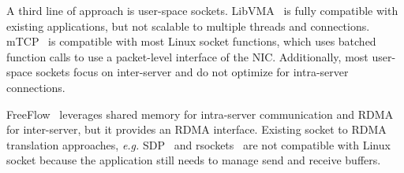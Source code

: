 A third line of approach is user-space sockets.
LibVMA~\cite{libvma} is fully compatible with existing applications, but not scalable to multiple threads and connections.
mTCP~\cite{jeong2014mtcp} is compatible with most Linux socket functions, which uses batched function calls to use a packet-level interface of the NIC.
Additionally, most user-space sockets focus on inter-server and do not optimize for intra-server connections.

FreeFlow~\cite{freeflow} leverages shared memory for intra-server communication and RDMA for inter-server, but it provides an RDMA interface.
Existing socket to RDMA translation approaches, \textit{e.g.} SDP~\cite{socketsdirect} and rsockets~\cite{rsockets} are not compatible with Linux socket because the application still needs to manage send and receive buffers.






\iffalse
Kernel-bypass TCP/IPs
IX [OSDI’14], Arrakis [OSDI’14], UTCP [CCR’14], Sandstorm [SIGCOMM’14], mTCP [NSDI’14], Seastar

Socket API enhancements
MegaPipe [OSDI’12], FlexSC [OSDI’10], KCM [Linux]

Improving OS stack with fast packet I/O
mSwitch [SOSR’15]

In-stack improvement
FastSocket [ASPLOS’16]

Running kernel stack in user-space
Rump [AsiaBSDCon’09], NUSE [netdev’15]
\fi



